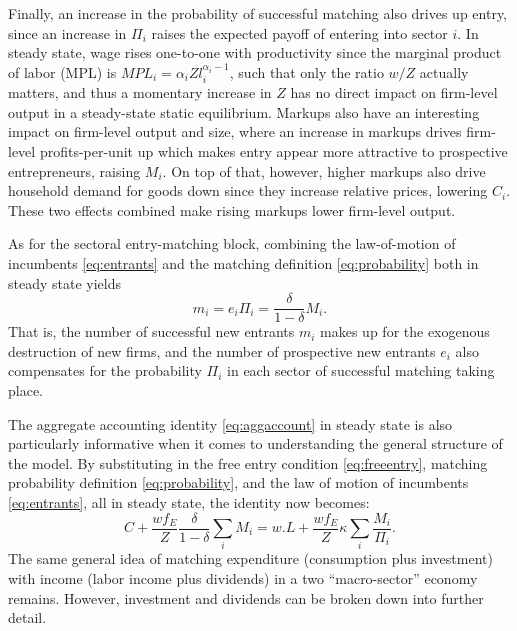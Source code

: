 \documentclass[a4paper,12pt]{article} %
\numberwithin{equation}{section} %
\numberwithin{figure}{section}
\numberwithin{table}{section}
\begin{document}
Finally, an increase in the probability of successful matching also drives up entry, since an increase in $\Pi_i$ 
raises the expected payoff of entering into
sector $i$. In steady state, wage rises one-to-one with productivity since the marginal product of labor (MPL) is 
$MPL_i = \alpha_i Z l_i^{\alpha_i -1}$, such that only the ratio $w/Z$ actually matters, and thus a momentary increase in $Z$ has no direct impact
on firm-level output in a steady-state static equilibrium. Markups also have an interesting impact on firm-level output and size, where an increase in 
markups drives firm-level profits-per-unit up which makes entry appear more attractive to prospective entrepreneurs, raising $M_i$.
On top of that, however, higher markups also drive household demand for goods down since they increase relative prices, 
lowering $C_i$. These two effects combined make rising markups lower firm-level output.

As for the sectoral entry-matching block, combining the law-of-motion of incumbents \eqref{eq:entrants} and the matching 
definition \eqref{eq:probability} both in steady state yields 
\begin{equation}
m_i= e_i\Pi_i= \frac{\delta}{1-\delta}M_i. \label{steadyentrants} 
\end{equation}
That is, the number of successful new entrants $m_i$ makes up for the exogenous destruction of new firms, and the 
number of prospective new entrants $e_i$ also compensates for the probability $\Pi_i$ in each sector of successful
matching taking place.

The aggregate accounting identity \eqref{eq:aggaccount} in steady state is also particularly informative when it
comes to understanding the general structure of the model. By substituting in the free entry condition 
\eqref{eq:freeentry}, matching probability definition \eqref{eq:probability}, and the law of motion of incumbents \eqref{eq:entrants}, 
all in steady state, the identity now becomes:
\begin{equation}
C + \frac{w f_E}{Z}\frac{\delta}{1-\delta}\sum_iM_{i}= w.L + \frac{w f_E}{Z}\kappa \sum_i\frac{M_i}{\Pi_i}. \label{aggsteadystate} 
\end{equation}
The same general idea of matching expenditure (consumption plus investment) with income (labor income plus dividends)
in a two ``macro-sector'' economy remains. However, investment and dividends can be broken down into further detail. 
\end{document}
